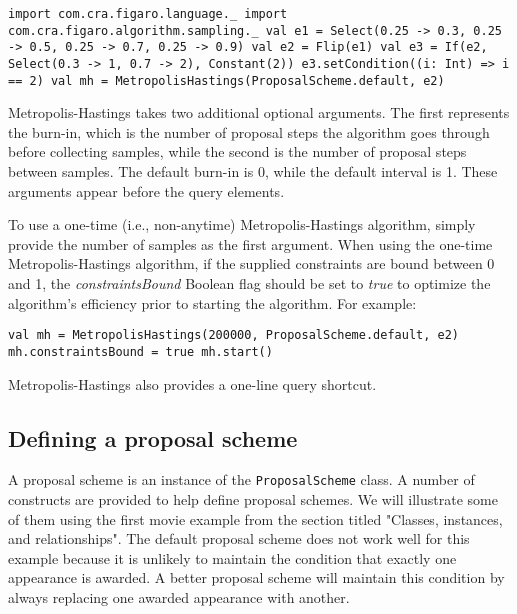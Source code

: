 \begin{flushleft}
\texttt{import com.cra.figaro.language.\_
\newline import com.cra.figaro.algorithm.sampling.\_
\newline 
\newline val e1 = Select(0.25 -> 0.3, 0.25 -> 0.5, 0.25 -> 0.7, 0.25 -> 0.9)
\newline val e2 = Flip(e1)
\newline val e3 = If(e2, Select(0.3 -> 1, 0.7 -> 2), Constant(2))
\newline e3.setCondition((i: Int) => i == 2)
\newline 
\newline val mh = MetropolisHastings(ProposalScheme.default, e2)
}
\end{flushleft}

Metropolis-Hastings takes two additional optional arguments. The first represents the burn-in, which is the number of proposal steps the algorithm goes through before collecting samples, while the second is the number of proposal steps between samples. The default burn-in is 0, while the default interval is 1. These arguments appear before the query elements.

To use a one-time (i.e., non-anytime) Metropolis-Hastings algorithm, simply provide the number of samples as the first argument. When using the one-time Metropolis-Hastings algorithm, if the supplied constraints are bound between 0 and 1, the \emph{constraintsBound} Boolean flag should be set to \emph{true} to optimize the algorithm's efficiency prior to starting the algorithm. For example:

\begin{flushleft}
\texttt{val mh = MetropolisHastings(200000, ProposalScheme.default, e2)
\newline mh.constraintsBound = true
\newline mh.start()
}
\end{flushleft}

Metropolis-Hastings also provides a one-line query shortcut.

\subsection{Defining a proposal scheme}

A proposal scheme is an instance of the \texttt{ProposalScheme} class. A number of constructs are provided to help define proposal schemes. We will illustrate some of them using the first movie example from the section titled "Classes, instances, and relationships". The default proposal scheme does not work well for this example because it is unlikely to maintain the condition that exactly one appearance is awarded. A better proposal scheme will maintain this condition by always replacing one awarded appearance with another.

